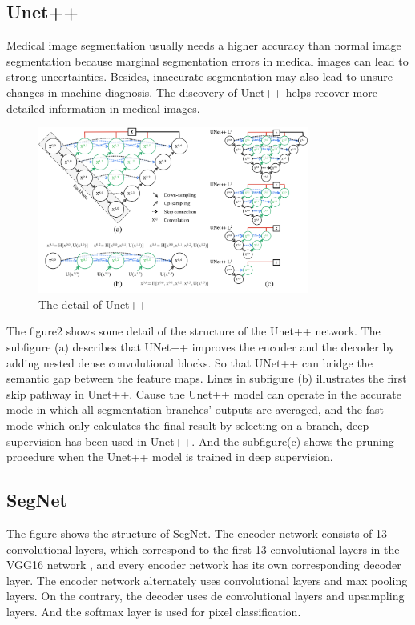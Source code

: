 \documentclass{article}
\begin{document}
\subsection{Unet++}
Medical image segmentation usually needs a higher accuracy than normal image segmentation because marginal segmentation errors in medical images can lead to strong uncertainties.
Besides, inaccurate segmentation may also lead to unsure changes in machine diagnosis.\cite{DBLP:journals/corr/abs-1807-10165}
The discovery of Unet++ helps recover more detailed information in medical images.


\begin{figure}[H]
    \centering
    \includegraphics[width = 3.5in]{Unet++}
    \caption{The detail of Unet++}
    \label{The detail of Unet++}
\end{figure}


The figure2 shows some detail of the structure of the Unet++ network.
The subfigure (a) describes that UNet++ improves the encoder and the decoder by adding nested dense convolutional blocks.
So that UNet++ can bridge the semantic gap between the feature maps.
Lines in subfigure (b) illustrates the first skip pathway in Unet++.
Cause the Unet++ model can operate in the accurate mode in which all segmentation branches’ outputs are averaged, and the fast mode which only calculates the final result by selecting on a branch, deep supervision has been used in Unet++.
And the subfigure(c) shows the pruning procedure when the Unet++ model is trained in deep supervision.\cite{DBLP:journals/corr/abs-1807-10165,zhou2020unet}

\subsection{SegNet}
The figure shows the structure of SegNet.
The encoder network consists of 13 convolutional layers, which correspond to the first 13 convolutional layers in the VGG16 network \cite{simonyan2014very}, and every encoder network has its own corresponding decoder layer.\cite{DBLP:journals/corr/BadrinarayananK15}
The encoder network alternately uses convolutional layers and max pooling layers. On the contrary, the decoder uses de convolutional layers and upsampling layers.
And the softmax layer is used for pixel classification.
\end{document}
